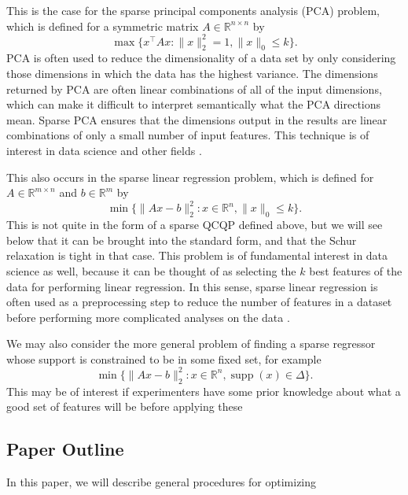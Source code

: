 \documentclass{amsart}
\theoremstyle{definition}
\newcommand{\R}{\mathbb{R}}
\DeclareMathOperator*{\supp}{supp}
\begin{document}
This is the case for the sparse principal components analysis (PCA) problem, which is defined for a symmetric matrix $A \in \R^{n\times n}$ by
\[
    \max \{x^{\intercal} A x : \|x\|_2^2 = 1, \|x\|_0 \le k\}.
\]
PCA is often used to reduce the dimensionality of a data set by only considering those dimensions in which the data has the highest variance.
The dimensions returned by PCA are often linear combinations of all of the input dimensions, which can make it difficult to interpret semantically what the PCA directions mean.
Sparse PCA ensures that the dimensions output in the results are linear combinations of only a small number of input features.
This technique is of interest in data science and other fields \cite{TODO}.

This also occurs in the sparse linear regression problem, which is defined for $A \in \R^{m \times n}$ and $b \in \R^m$ by
\[
    \min \{\|A x - b\|^2_2 : x \in \R^n, \|x\|_0 \le k\}.
\]
This is not quite in the form of a sparse QCQP defined above, but we will see below that it can be brought into the standard form, and that the Schur relaxation is tight in that case.
This problem is of fundamental interest in data science as well, because it can be thought of as selecting the $k$ best features of the data for performing linear regression.
In this sense, sparse linear regression is often used as a preprocessing step to reduce the number of features in a dataset before performing more complicated analyses on the data \cite{TODO}.

We may also consider the more general problem of finding a sparse regressor whose support is constrained to be in some fixed set, for example
\[
    \min \{\|A x - b\|^2_2 : x \in \R^n, \supp(x) \in \Delta\}.
\]
This may be of interest if experimenters have some prior knowledge about what a good set of features will be before applying these 

\subsection{Paper Outline}
In this paper, we will describe general procedures for optimizing 



%
%
\end{document}

